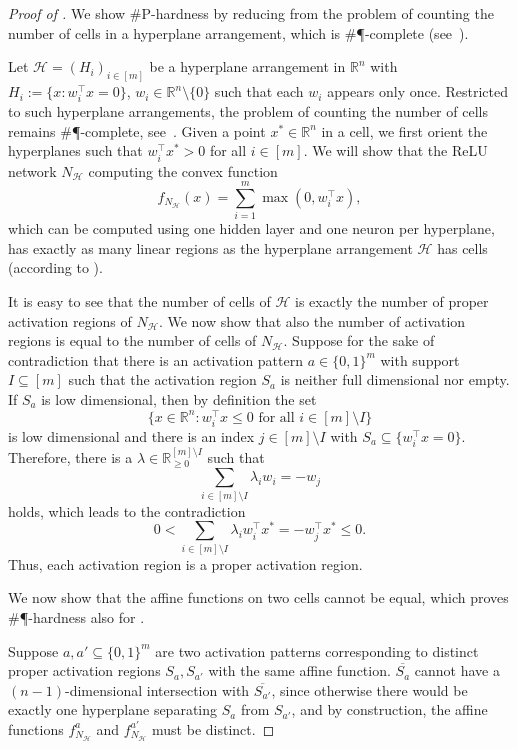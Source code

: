 \documentclass{article}
\begin{document}
\begin{proof}[Proof of ]
We show \#P-hardness by reducing from the problem of counting the number of cells in a hyperplane arrangement, which is \#\P-complete (see~\citep{linial1986hard}).

Let $\mathcal{H}=(H_i)_{i\in [m]}$ be a hyperplane arrangement in $\mathbb{R}^n$ with $H_i:=\{x: w_i^\top x=0\}$, $w_i\in \mathbb{R}^n\setminus \{0\}$ such that each $w_i$ appears only once.
Restricted to such hyperplane arrangements, the problem of counting the number of cells remains \#\P-complete, see~\citep{linial1986hard}.
Given a point $x^*\in \mathbb{R}^n$ in a cell, we first orient the hyperplanes such that $w_i^\top x^* > 0$ for all $i\in [m]$.
We will show that the ReLU network $N_\mathcal{H}$ computing the convex function
\[
f_{N_\mathcal{H}}(x)=\sum_{i=1}^m \max(0, w_i^\top x),
\]
which can be computed using one hidden layer and one neuron per hyperplane, has exactly as many linear regions as the hyperplane arrangement $\mathcal{H}$ has cells (according to ).

It is easy to see that the number of cells of $\mathcal{H}$ is exactly the number of proper activation regions of $N_\mathcal{H}$.
We now show that also the number of activation regions is equal to the number of cells of $N_\mathcal{H}$.
Suppose for the sake of contradiction that there is an activation pattern $a\in \{0,1\}^m$ with support $I\subseteq [m]$ such that the activation region $S_a$ is neither full dimensional nor empty.
If $S_a$ is low dimensional, then by definition the set
\[
\{x\in \mathbb{R}^n: w_i^\top x \leq 0 \text{ for all }i\in [m]\setminus I\}
\]
is low dimensional and there is an index $j\in [m]\setminus I$ with $S_a\subseteq \{w_i^\top x = 0\}$.
Therefore, there is a $\lambda \in \mathbb{R}_{\geq 0}^{[m]\setminus I}$ such that
\[
\sum_{i\in [m]\setminus I} \lambda_i w_i = -w_j
\]
holds, which leads to the contradiction
\[
0<\sum_{i\in [m]\setminus I} \lambda_i w_i^\top x^* = -w_j^\top x^*\leq 0.
\]
Thus, each activation region is a proper activation region.

We now show that the affine functions on two cells cannot be equal, which proves \#\P-hardness also for .

Suppose $a,a'\subseteq \{0,1\}^m$ are two activation patterns corresponding to distinct proper activation regions $S_{a}, S_{a'}$ with the same affine function.
$\overline{S_{a}}$ cannot have a $(n-1)$-dimensional intersection with $\overline{S_{a'}}$, since otherwise there would be exactly one hyperplane separating $S_{a}$ from $S_{a'}$, and by construction, the affine functions $f_{N_\mathcal{H}}^a$ and $f_{N_\mathcal{H}}^{a'}$ must be distinct.


\end{proof}
\end{document}
